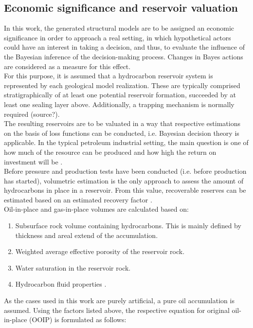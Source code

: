        \subsection{Economic significance and reservoir valuation}\label{sec:Reservoir_values}
        In this work, the generated structural models are to be assigned an economic significance in order to approach a real setting, in which hypothetical actors could have an interest in taking a decision, and thus, to evaluate the influence of the Bayesian inference of the decision-making process. Changes in Bayes actions are considered as a measure for this effect.\\
        For this purpose, it is assumed that a hydrocarbon reservoir system is represented by each geological model realization. These are typically comprised stratigraphically of at least one potential reservoir formation, succeeded by at least one sealing layer above. Additionally, a trapping mechanism is normally required (source?).\\
        The resulting reservoirs are to be valuated in a way that respective estimations on the basis of loss functions can be conducted, i.e. Bayesian decision theory is applicable. In the typical petroleum industrial setting, the main question is one of how much of the resource can be produced and how high the return on investment will be \citep{dean2007volumetric}.\\
        Before pressure and production tests have been conducted (i.e. before production has started), volumetric estimation is the only approach to assess the amount of hydrocarbons in place in a reservoir. From this value, recoverable reserves can be estimated based on an estimated recovery factor \citep{dean2007volumetric}.\\
        Oil-in-place and gas-in-place volumes are calculated based on:
        \begin{enumerate}
        \item Subsurface rock volume containing hydrocarbons. This is mainly defined by thickness and areal extend of the accumulation.
        \item Weighted average effective porosity of the reservoir rock.
        \item Water saturation in the reservoir rock.
        \item Hydrocarbon fluid properties \citep{dean2007volumetric}.
        \end{enumerate}
        As the cases used in this work are purely artificial, a pure oil accumulation is assumed. Using the factors listed above, the respective equation for original oil-in-place (OOIP) is formulated as follows:
